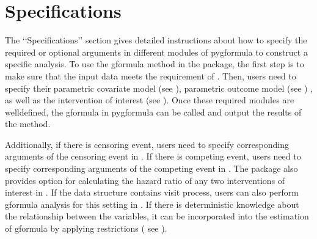 \documentclass[letterpaper,10pt,english]{sphinxmanual}
\begin{document}
\chapter{Specifications}
\label{\detokenize{Specifications/index:specifications}}\label{\detokenize{Specifications/index::doc}}
\sphinxAtStartPar
The ‘‘Specifications’’ section gives detailed instructions about how to specify the required or optional
arguments in different modules of pygformula to construct a specific analysis. To use the g\sphinxhyphen{}formula method in the package,
the first step is to make sure that the input data meets the requirement of
{\hyperref[\detokenize{Specifications/Input data::doc}]{}}.
Then, users need to specify their parametric covariate model (see {\hyperref[\detokenize{Specifications/Covariate model::doc}]{}}),
parametric outcome model (see {\hyperref[\detokenize{Specifications/Outcome model::doc}]{}})
, as well as the intervention of interest (see {\hyperref[\detokenize{Specifications/Intervention::doc}]{}}).
Once these required modules are well\sphinxhyphen{}defined, the g\sphinxhyphen{}formula in pygformula can be called and output the results of the method.

\sphinxAtStartPar
Additionally, if there is censoring event, users need to specify corresponding arguments of the censoring event in
{\hyperref[\detokenize{Specifications/Censoring event::doc}]{}}.
If there is competing event, users need to specify corresponding arguments of the competing event in
{\hyperref[\detokenize{Specifications/Competing event::doc}]{}}.
The package also provides option for calculating the hazard ratio of any two interventions of interest in
{\hyperref[\detokenize{Specifications/Hazard ratio::doc}]{}}.
If the data structure contains visit process, users can also perform g\sphinxhyphen{}formula analysis for this setting in
{\hyperref[\detokenize{Specifications/Visit process::doc}]{}}.
If there is deterministic knowledge about the relationship between the variables, it can be incorporated into the estimation
of g\sphinxhyphen{}formula by applying restrictions ( see {\hyperref[\detokenize{Specifications/Deterministic knowledge::doc}]{}}).
\end{document}
